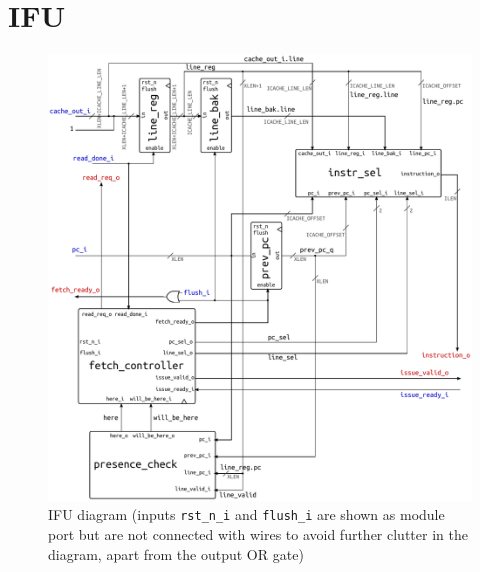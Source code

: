 \section{\acf{IFU}}\label{sec:ifu}
\begin{figure}[hbt]
  \centering
  \includegraphics[width=\textwidth]{img/ifu.pdf}
  \caption[\acs{IFU} diagram]{\acs{IFU} diagram (inputs \texttt{rst\_n\_i} and \texttt{flush\_i} are shown as module port but are not connected with wires to avoid further clutter in the diagram, apart from the output OR gate)}
  \label{fig:ifu}
\end{figure}
